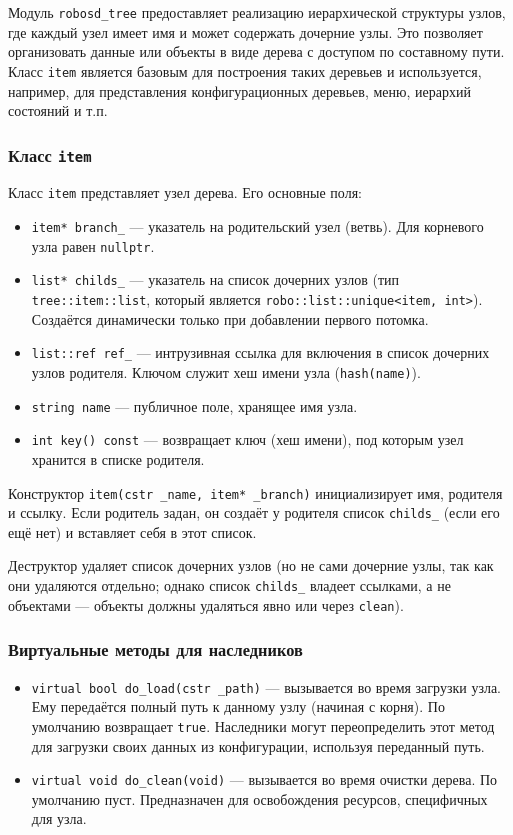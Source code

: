 \documentclass[a4paper,12pt]{article}
\begin{document}
Модуль \texttt{robosd\_tree} предоставляет реализацию иерархической структуры узлов, где каждый узел имеет имя и может содержать дочерние узлы. Это позволяет организовать данные или объекты в виде дерева с доступом по составному пути. Класс \texttt{item} является базовым для построения таких деревьев и используется, например, для представления конфигурационных деревьев, меню, иерархий состояний и т.п.

\subsubsection{Класс \texttt{item}}

Класс \texttt{item} представляет узел дерева. Его основные поля:

\begin{itemize}
    \item \texttt{item* branch\_} — указатель на родительский узел (ветвь). Для корневого узла равен \texttt{nullptr}.
    \item \texttt{list* childs\_} — указатель на список дочерних узлов (тип \texttt{tree::item::list}, который является \texttt{robo::list::unique<item, int>}). Создаётся динамически только при добавлении первого потомка.
    \item \texttt{list::ref ref\_} — интрузивная ссылка для включения в список дочерних узлов родителя. Ключом служит хеш имени узла (\texttt{hash(name)}).
    \item \texttt{string name} — публичное поле, хранящее имя узла.
    \item \texttt{int key() const} — возвращает ключ (хеш имени), под которым узел хранится в списке родителя.
\end{itemize}

Конструктор \texttt{item(cstr \_name, item* \_branch)} инициализирует имя, родителя и ссылку. Если родитель задан, он создаёт у родителя список \texttt{childs\_} (если его ещё нет) и вставляет себя в этот список.

Деструктор удаляет список дочерних узлов (но не сами дочерние узлы, так как они удаляются отдельно; однако список \texttt{childs\_} владеет ссылками, а не объектами — объекты должны удаляться явно или через \texttt{clean}).

\subsubsection{Виртуальные методы для наследников}

\begin{itemize}
    \item \texttt{virtual bool do\_load(cstr \_path)} — вызывается во время загрузки узла. Ему передаётся полный путь к данному узлу (начиная с корня). По умолчанию возвращает \texttt{true}. Наследники могут переопределить этот метод для загрузки своих данных из конфигурации, используя переданный путь.
    \item \texttt{virtual void do\_clean(void)} — вызывается во время очистки дерева. По умолчанию пуст. Предназначен для освобождения ресурсов, специфичных для узла.
\end{itemize}
\end{document}

